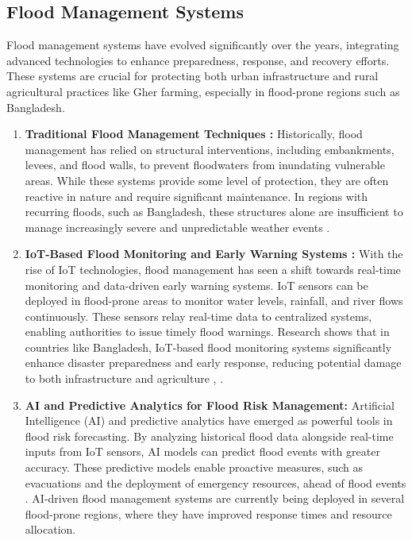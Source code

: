 \documentclass[conference]{IEEEtran}
\begin{document}
\subsection{ \textbf{Flood Management Systems}}
Flood management systems have evolved significantly over the years, integrating advanced technologies to enhance preparedness, response, and recovery efforts. These systems are crucial for protecting both urban infrastructure and rural agricultural practices like Gher farming, especially in flood-prone regions such as Bangladesh.
\begin{enumerate}

\item \textbf{ Traditional Flood Management Techniques :}
Historically, flood management has relied on structural interventions, including embankments, levees, and flood walls, to prevent floodwaters from inundating vulnerable areas. While these systems provide some level of protection, they are often reactive in nature and require significant maintenance. In regions with recurring floods, such as Bangladesh, these structures alone are insufficient to manage increasingly severe and unpredictable weather events \cite{ref9}.

\item \textbf{ IoT-Based Flood Monitoring and Early Warning Systems : }
With the rise of IoT technologies, flood management has seen a shift towards real-time monitoring and data-driven early warning systems. IoT sensors can be deployed in flood-prone areas to monitor water levels, rainfall, and river flows continuously. These sensors relay real-time data to centralized systems, enabling authorities to issue timely flood warnings. Research shows that in countries like Bangladesh, IoT-based flood monitoring systems significantly enhance disaster preparedness and early response, reducing potential damage to both infrastructure and agriculture \cite{ref10}, \cite{ref11}.

\item \textbf{AI and Predictive Analytics for Flood Risk Management: }
Artificial Intelligence (AI) and predictive analytics have emerged as powerful tools in flood risk forecasting. By analyzing historical flood data alongside real-time inputs from IoT sensors, AI models can predict flood events with greater accuracy. These predictive models enable proactive measures, such as evacuations and the deployment of emergency resources, ahead of flood events \cite{ref12}. AI-driven flood management systems are currently being deployed in several flood-prone regions, where they have improved response times and resource allocation.


\end{enumerate}
\end{document}

